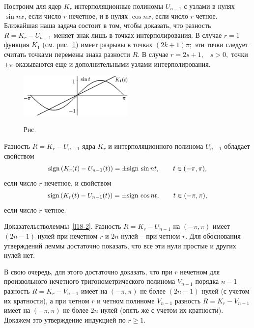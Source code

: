 Построим для ядер  $K_r$
 интерполяционные полиномы $U_{n-1}$ с узлами в нулях $\sin nx$, если число $r$ нечетное,
 и в нулях  $\cos nx$, если число $r$ четное.
 Ближайшая наша задача состоит в том, чтобы доказать, что разность  $R=K_r-U_{n-1}$
 меняет знак лишь в точках интерполирования.
 В случае $r=1$ функция $K_1$ (см. рис.~\ref{r18-1}) имеет разрывы в точках $(2k+1)\pi;$ эти точки следует
 считать точками перемены знака разности $R.$
 В случае  $r=2s+1,$~ $s>0,$  точки $\pm\pi$ оказываются еще и дополнительными узлами
 интерполирования.

\begin{figure}[ht]
\begin{center}
\includegraphics[width=0.5\textwidth]{pict/pict18-1.eps}
\end{center}
 \label{r18-1}

 \centerline{Рис.~\theris}
\end{figure}





 \begin{lemma}\label{l18-2}
 Разность $R=K_r-U_{n-1}$ ядра $K_r$ и интерполяционного
 полинома
 $U_{n-1}$ обладает свойством
 $$
 {\rm sign \, }(K_r(t)-U_{n-1}(t))=\pm {\rm sign \, } \sin nt,\qquad t\in(-\pi,\pi),
 $$
  если число $r$ нечетное, и свойством
 $$
 {\rm sign \, }(K_r(t)-U_{n-1}(t))=\pm {\rm sign \, } \cos nt,\qquad t\in(-\pi,\pi),
 $$
  если число $r$ четное.
 \end{lemma}

Д\;о\;к\;а\;з\;а\;т\;е\;л\;ь\;с\;т\;в\;о\quad леммы~\ref{l18-2}.
Разность $R=K_r-U_{n-1}$ на $(-\pi,\pi)$ имеет $(2n-1)$ нулей при нечетном $r$ и
$2n$ нулей -- при четном $r.$ Для обоснования утверждений леммы достаточно
показать, что все эти нули простые и других нулей нет.

В свою очередь, для этого достаточно доказать, что при $r$ нечетном
для произвольного нечетного тригонометрического полинома $V_{n-1}$ порядка $n-1$ разность
$R=K_r-V_{n-1}$ имеет на $(-\pi,\pi)$ не более $(2n-1)$ нулей (с учетом их
кратности), а при четном $r$ и четном полиноме $V_{n-1}$
разность $R=K_r-V_{n-1}$  имеет на $(-\pi,\pi)$ не более
$2n$ нулей {(опять же с учетом их
кратности).} Докажем это утверждение  индукцией по $r\ge 1.$


